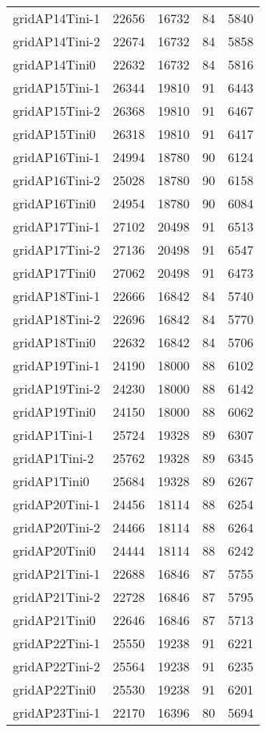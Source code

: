 \begin{tabular}{lrrrr}
gridAP14Tini-1 & 22656 & 16732 & 84 & 5840 \\
gridAP14Tini-2 & 22674 & 16732 & 84 & 5858 \\
gridAP14Tini0 & 22632 & 16732 & 84 & 5816 \\
gridAP15Tini-1 & 26344 & 19810 & 91 & 6443 \\
gridAP15Tini-2 & 26368 & 19810 & 91 & 6467 \\
gridAP15Tini0 & 26318 & 19810 & 91 & 6417 \\
gridAP16Tini-1 & 24994 & 18780 & 90 & 6124 \\
gridAP16Tini-2 & 25028 & 18780 & 90 & 6158 \\
gridAP16Tini0 & 24954 & 18780 & 90 & 6084 \\
gridAP17Tini-1 & 27102 & 20498 & 91 & 6513 \\
gridAP17Tini-2 & 27136 & 20498 & 91 & 6547 \\
gridAP17Tini0 & 27062 & 20498 & 91 & 6473 \\
gridAP18Tini-1 & 22666 & 16842 & 84 & 5740 \\
gridAP18Tini-2 & 22696 & 16842 & 84 & 5770 \\
gridAP18Tini0 & 22632 & 16842 & 84 & 5706 \\
gridAP19Tini-1 & 24190 & 18000 & 88 & 6102 \\
gridAP19Tini-2 & 24230 & 18000 & 88 & 6142 \\
gridAP19Tini0 & 24150 & 18000 & 88 & 6062 \\
gridAP1Tini-1 & 25724 & 19328 & 89 & 6307 \\
gridAP1Tini-2 & 25762 & 19328 & 89 & 6345 \\
gridAP1Tini0 & 25684 & 19328 & 89 & 6267 \\
gridAP20Tini-1 & 24456 & 18114 & 88 & 6254 \\
gridAP20Tini-2 & 24466 & 18114 & 88 & 6264 \\
gridAP20Tini0 & 24444 & 18114 & 88 & 6242 \\
gridAP21Tini-1 & 22688 & 16846 & 87 & 5755 \\
gridAP21Tini-2 & 22728 & 16846 & 87 & 5795 \\
gridAP21Tini0 & 22646 & 16846 & 87 & 5713 \\
gridAP22Tini-1 & 25550 & 19238 & 91 & 6221 \\
gridAP22Tini-2 & 25564 & 19238 & 91 & 6235 \\
gridAP22Tini0 & 25530 & 19238 & 91 & 6201 \\
gridAP23Tini-1 & 22170 & 16396 & 80 & 5694 \\

\end{tabular}
